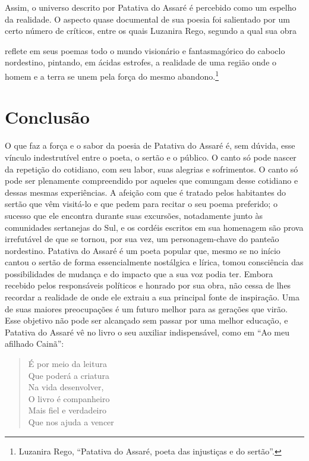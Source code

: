 Assim, o universo descrito por Patativa do Assaré é percebido como um espelho da
realidade. O aspecto quase documental de sua poesia foi salientado por um certo
número de críticos, entre os quais Luzanira Rego, segundo a qual sua obra

\begin{hedraquote}
reflete em seus poemas todo o mundo visionário e fantasmagórico do caboclo
nordestino, pintando, em ácidas estrofes, a realidade de uma região onde o homem
e a terra se unem pela força do mesmo abandono.\footnote{ Luzanira Rego,
“Patativa do Assaré, poeta das injustiças e do sertão”.}
\end{hedraquote}


\section{Conclusão}



O que faz a força e o sabor da poesia de Patativa do Assaré é, sem dúvida, esse
vínculo indestrutível entre o poeta, o sertão e o público. O canto só pode
nascer da repetição do cotidiano, com seu labor, suas alegrias e sofrimentos. O
canto só pode ser plenamente compreendido por aqueles que comungam desse
cotidiano e dessas mesmas experiências. A afeição com que é tratado pelos
habitantes do sertão que vêm visitá-lo e que pedem para recitar o seu poema
preferido; o sucesso que ele encontra durante suas excursões, notadamente junto
às comunidades sertanejas do Sul, e os cordéis escritos em sua homenagem são
prova irrefutável de que se tornou, por sua vez, um personagem-chave do panteão
nordestino. Patativa do Assaré é um poeta popular que, mesmo se no início
cantou o sertão de forma essencialmente nostálgica e lírica, tomou consciência
das possibilidades de mudança e do impacto que a sua voz podia ter. Embora
recebido pelos responsáveis políticos e honrado por sua obra, não cessa de lhes
recordar a realidade de onde ele extraiu a sua principal fonte de inspiração.
Uma de suas maiores preocupações é um futuro melhor para as gerações que virão.
Esse objetivo não pode ser alcançado sem passar por uma melhor educação, e
Patativa do Assaré vê no livro o seu auxiliar indispensável, como em “Ao meu
afilhado Cainã”: 

\begin{verse}
É por meio da leitura \\
Que poderá a criatura \\
Na vida desenvolver, \\
O livro é companheiro \\
Mais fiel e verdadeiro \\
Que nos ajuda a vencer 
\end{verse}

